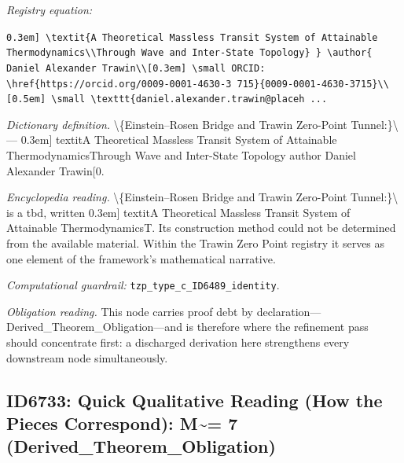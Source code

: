 \documentclass[11pt]{article}
\theoremstyle{remark}
\begin{document}
\noindent\textit{Registry equation:}\par
{\small\texttt{0.3em] \textbackslash{}textit\{A Theoretical Massless Transit System of Attainable Thermodynamics\textbackslash{}\textbackslash{}Through Wave and Inter-State Topology\} \} \textbackslash{}author\{ Daniel Alexander Trawin\textbackslash{}\textbackslash{}[0.3em] \textbackslash{}small ORCID: \textbackslash{}href\{https://orcid.org/0009-0001-4630-3 715\}\{0009-0001-4630-3715\}\textbackslash{}\textbackslash{}[0.5em] \textbackslash{}small \textbackslash{}texttt\{daniel.alexander.trawin@placeh ...}}\par\medskip
\noindent\textit{Dictionary definition.} \textbackslash{}\{Einstein--Rosen Bridge and Trawin Zero-Point Tunnel:\}\textbackslash{} --- 0.3em] textitA Theoretical Massless Transit System of Attainable ThermodynamicsThrough Wave and Inter-State Topology author Daniel Alexander Trawin[0.\par\medskip
\noindent\textit{Encyclopedia reading.} \textbackslash{}\{Einstein--Rosen Bridge and Trawin Zero-Point Tunnel:\}\textbackslash{} is a tbd, written 0.3em] textitA Theoretical Massless Transit System of Attainable ThermodynamicsT. Its construction method could not be determined from the available material. Within the Trawin Zero Point registry it serves as one element of the framework's mathematical narrative.
\par\medskip\noindent\textit{Computational guardrail:} \texttt{tzp\_type\_c\_ID6489\_identity}.
\par\medskip\noindent\textit{Obligation reading.} This node carries proof debt by declaration---Derived\_Theorem\_Obligation---and is therefore where the refinement pass should concentrate first: a discharged derivation here strengthens every downstream node simultaneously.

\subsection{ID6733: Quick Qualitative Reading (How the Pieces Correspond): M\textasciitilde{}= 7 (Derived\_Theorem\_Obligation)}
\end{document}
